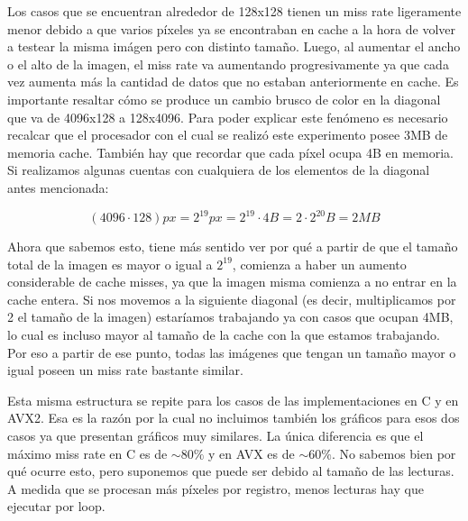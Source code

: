 Los casos que se encuentran alrededor de 128x128 tienen un miss rate ligeramente menor debido a que varios píxeles ya se encontraban en cache a la hora de volver a testear la misma imágen pero con distinto tamaño. Luego, al aumentar el ancho o el alto de la imagen, el miss rate va aumentando progresivamente ya que cada vez aumenta más la cantidad de datos que no estaban anteriormente en cache.
Es importante resaltar cómo se produce un cambio brusco de color en la diagonal que va de 4096x128 a 128x4096. Para poder explicar este fenómeno es necesario recalcar que el procesador con el cual se realizó este experimento posee 3MB de memoria cache. También hay que recordar que cada píxel ocupa 4B en memoria. Si realizamos algunas cuentas con cualquiera de los elementos de la diagonal antes mencionada:

$$(4096 \cdot 128) px = 2^{19} px = 2^{19} \cdot 4 B = 2 \cdot 2^{20} B = 2MB$$

Ahora que sabemos esto, tiene más sentido ver por qué a partir de que el tamaño total de la imagen es mayor o igual a $2^{19}$, comienza a haber un aumento considerable de cache misses, ya que la imagen misma comienza a no entrar en la cache entera. Si nos movemos a la siguiente diagonal (es decir, multiplicamos por 2 el tamaño de la imagen) estaríamos trabajando ya con casos que ocupan 4MB, lo cual es incluso mayor al tamaño de la cache con la que estamos trabajando. Por eso a partir de ese punto, todas las imágenes que tengan un tamaño mayor o igual poseen un miss rate bastante similar.

Esta misma estructura se repite para los casos de las implementaciones en C y en AVX2. Esa es la razón por la cual no incluimos también los gráficos para esos dos casos ya que presentan gráficos muy similares. La única diferencia es que el máximo miss rate en C es de $\sim80\%$ y en AVX es de $\sim60\%$. No sabemos bien por qué ocurre esto, pero suponemos que puede ser debido al tamaño de las lecturas. A medida que se procesan más píxeles por registro, menos lecturas hay que ejecutar por loop.